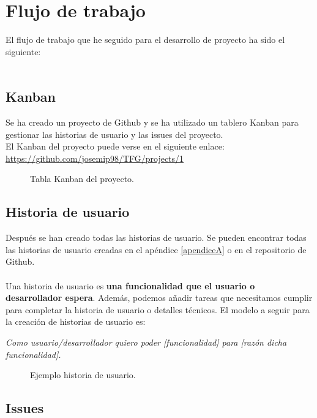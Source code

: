 \section{Flujo de trabajo} \label{sec:flujo_trabajo}

El flujo de trabajo que he seguido para el desarrollo de proyecto ha sido el siguiente:\\\\

\subsection{Kanban}

Se ha creado un proyecto de Github y se ha utilizado un tablero Kanban para gestionar las historias de usuario y las issues del proyecto.\\

El Kanban del proyecto puede verse en el siguiente enlace:
\url{https://github.com/josemip98/TFG/projects/1}

\begin{figure}[H]
  	\centering
  	\noindent{}
  	\caption{Tabla Kanban del proyecto.}
	\end{figure}

\subsection{Historia de usuario}

Después se han creado todas las historias de usuario.
Se pueden encontrar todas las historias de usuario creadas en el apéndice \ref*{apendiceA} o en el repositorio de Github\cite{user-stories}.\\\\
Una historia de usuario es \textbf{una funcionalidad que el usuario o desarrollador espera}.
Además, podemos añadir tareas que necesitamos cumplir para completar la historia de usuario o detalles técnicos.
El modelo a seguir para la creación de historias de usuario es:
 
\textit{Como usuario/desarrollador quiero poder [funcionalidad] para [razón dicha funcionalidad].}

\begin{figure}[H]
	\centering
	\noindent{}
	\caption{Ejemplo historia de usuario.}
  	\end{figure}

\subsection{Issues}


